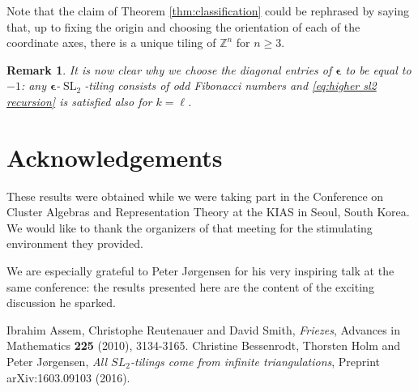 \documentclass[12pt]{amsart}
\newtheorem{remark}[theorem]{Remark}
\newcommand{\bepsilon}{\boldsymbol{\epsilon}}
\newcommand{\SL}{\operatorname{SL}}
\newcommand{\ZZ}{\mathbb{Z}}
\begin{document}
  Note that the claim of Theorem \ref{thm:classification} could be rephrased by saying that, up to fixing the origin and choosing the orientation of each of the coordinate axes, there is a unique tiling of $\ZZ^n$ for $n\ge3$.
  
  \begin{remark}
    It is now clear why we choose the diagonal entries of $\bepsilon$ to be equal to $-1$: any $\bepsilon$-$\SL_2$-tiling consists of odd Fibonacci numbers and \eqref{eq:higher sl2 recursion} is satisfied also for $k=\ell$.
  \end{remark} 

\section*{Acknowledgements}
  These results were obtained while we were taking part in the Conference on Cluster Algebras and Representation Theory at the KIAS in Seoul, South Korea. 
  We would like to thank the organizers of that meeting for the stimulating environment they provided.
  
  We are especially grateful to Peter J\o rgensen for his very inspiring talk at the same conference: the results presented here are the content of the exciting discussion he sparked.

\begin{thebibliography}{99}
   Ibrahim Assem, Christophe Reutenauer and David Smith, \emph{Friezes}, Advances in Mathematics {\bf 225} (2010), 3134-3165.
   Christine Bessenrodt, Thorsten Holm and Peter J{\o}rgensen, \emph{All $SL_2$-tilings come from infinite triangulations}, Preprint arXiv:1603.09103 (2016).
\end{thebibliography}
\end{document}
